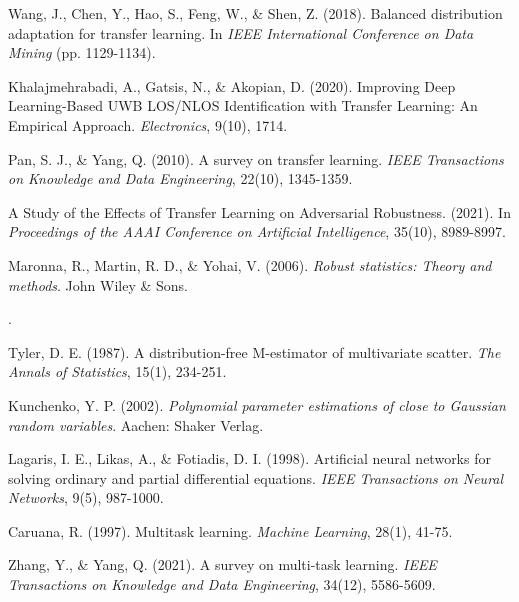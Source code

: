 \documentclass[12pt,a4paper]{article}
\begin{document}
\begin{thebibliography}{99}
		Wang, J., Chen, Y., Hao, S., Feng, W., \& Shen, Z. (2018). Balanced distribution adaptation for transfer learning. In \textit{IEEE International Conference on Data Mining} (pp. 1129-1134).
		
		Khalajmehrabadi, A., Gatsis, N., \& Akopian, D. (2020). Improving Deep Learning-Based UWB LOS/NLOS Identification with Transfer Learning: An Empirical Approach. \textit{Electronics}, 9(10), 1714.
		
		
		Pan, S. J., \& Yang, Q. (2010). A survey on transfer learning. \textit{IEEE Transactions on Knowledge and Data Engineering}, 22(10), 1345-1359.
		
		
		A Study of the Effects of Transfer Learning on Adversarial Robustness. (2021). In \textit{Proceedings of the AAAI Conference on Artificial Intelligence}, 35(10), 8989-8997.
		
		
		Maronna, R., Martin, R. D., \& Yohai, V. (2006). \textit{Robust statistics: Theory and methods}. John Wiley \& Sons.
		
		.
		
		Tyler, D. E. (1987). A distribution-free M-estimator of multivariate scatter. \textit{The Annals of Statistics}, 15(1), 234-251.
		
		Kunchenko, Y. P. (2002). \textit{Polynomial parameter estimations of close to Gaussian random variables}. Aachen: Shaker Verlag.
		
		
		
		Lagaris, I. E., Likas, A., \& Fotiadis, D. I. (1998). Artificial neural networks for solving ordinary and partial differential equations. \textit{IEEE Transactions on Neural Networks}, 9(5), 987-1000.
		
		
		Caruana, R. (1997). Multitask learning. \textit{Machine Learning}, 28(1), 41-75.
		
		Zhang, Y., \& Yang, Q. (2021). A survey on multi-task learning. \textit{IEEE Transactions on Knowledge and Data Engineering}, 34(12), 5586-5609.
		

\end{thebibliography}
\end{document}

